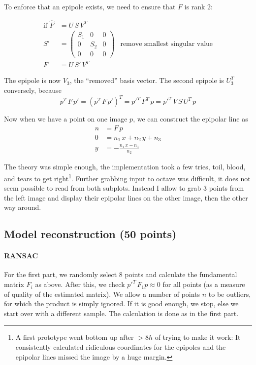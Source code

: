 \documentclass{paper}
\begin{document}
To enforce that an epipole exists, we need to ensure that $F$ is rank 2:

\begin{align*}
\text{if } \hat F &= U\, S\, V^T\\
S' &= \begin{pmatrix}
S_1 & 0& 0\\
0& S_2 & 0\\
0 & 0& 0
\end{pmatrix}&\text{remove smallest singular value}\\
F &= U\, S'\, V^T
\end{align*}

The epipole is now $V_3$, the ``removed'' basis vector. The second epipole is $U^T_3$ conversely, because
\[p^T\, F\, p' = (p^T\, F\, p')^T = p'^T\, F^T\, p = p'^T\, V\, S\, U^T\, p\]

Now when we have a point on one image $p$, we can construct the epipolar line as
\begin{align*}
n&=F\, p\\
0&=n_1\, x + n_2\, y + n_3\\
y &= -\frac{n_1\, x-n_3}{n_2}
\end{align*}

The theory was simple enough, the implementation took a few tries, toil, blood, and tears to get right\footnote{A first prototype went bottom up after $>8 h$ of trying to make it work: It consistently calculated ridiculous coordinates for the epipoles and the epipolar lines missed the image by a huge margin.}. Further grabbing input to octave was difficult, it does not seem possible to read from
both subplots. Instead I allow to grab 3 points from the left image and display their epipolar lines on 
the other image, then the other way around.

\subsection{Model reconstruction (50 points)}
\paragraph{RANSAC}
For the first part, we randomly select 8 points and calculate the fundamental matrix $F_i$ as above. 
After this, we check $p'^T\, F_1 p\approx 0$ for all points (as a measure of 
quality of the estimated matrix). We allow a number of points $n$ to be outliers, for which the
product is simply ignored. If it is good enough, we stop, else we start over with a different
sample. The calculation is done as in the first part.
\end{document}
